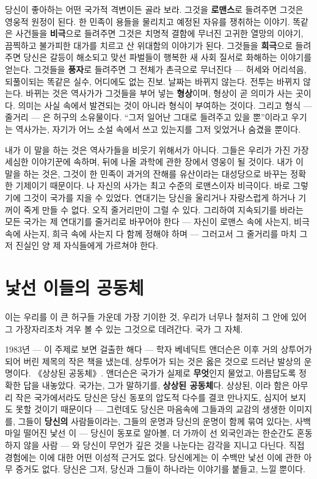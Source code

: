 당신이 좋아하는 어떤 국가적 격변이든 골라 보라. 그것을 \textbf{로맨스}로 들려주면 그것은 영웅적 원정이 된다. 한 민족이 용들을 물리치고 예정된 자유를 쟁취하는 이야기. 똑같은 사건들을 \textbf{비극}으로 들려주면 그것은 치명적 결함에 무너진 고귀한 열망의 이야기, 끔찍하고 불가피한 대가를 치르고 산 위대함의 이야기가 된다. 그것들을 \textbf{희극}으로 들려주면 당신은 갈등이 해소되고 맞선 파벌들이 행복한 새 사회 질서로 화해하는 이야기를 얻는다. 그것들을 \textbf{풍자}로 들려주면 그 전체가 촌극으로 무너진다 — 허세와 어리석음, 되풀이되는 똑같은 실수, 어디에도 없는 진보. 날짜는 바뀌지 않는다. 전투는 바뀌지 않는다. 바뀌는 것은 역사가가 그것들을 부어 넣는 \textbf{형상}이며, 형상이 곧 의미가 사는 곳이다. 의미는 사실 속에서 발견되는 것이 아니라 형식이 부여하는 것이다. 그리고 형식 — 줄거리 — 은 허구의 소유물이다. ``그저 일어난 그대로 들려주고 있을 뿐''이라고 우기는 역사가는, 자기가 어느 소설 속에서 쓰고 있는지를 그저 잊었거나 숨겼을 뿐이다.

내가 이 말을 하는 것은 역사가들을 비웃기 위해서가 아니다. 그들은 우리가 가진 가장 세심한 이야기꾼에 속하며, 뒤에 나올 과학에 관한 장에서 영웅이 될 것이다. 내가 이 말을 하는 것은, 그것이 한 민족이 과거의 잔해를 유산이라는 대성당으로 바꾸는 정확한 기제이기 때문이다. 나 자신의 사가는 최고 수준의 로맨스이자 비극이다. 바로 그렇기에 그것이 국가를 지을 수 있었다. 연대기는 당신을 울리거나 자랑스럽게 하거나 기꺼이 죽게 만들 수 없다. 오직 줄거리만이 그럴 수 있다. 그리하여 지속되기를 바라는 모든 국가는 제 연대기를 줄거리로 바꾸어야 한다 — 자신이 로맨스 속에 사는지, 비극 속에 사는지, 희극 속에 사는지 다 함께 정해야 하며 — 그러고서 그 줄거리를 마치 그저 진실인 양 제 자식들에게 가르쳐야 한다.

\section*{낯선 이들의 공동체}

이는 우리를 이 큰 허구들 가운데 가장 기이한 것, 우리가 너무나 철저히 그 안에 있어 그 가장자리조차 겨우 볼 수 있는 그것으로 데려간다. 국가 그 자체.

1983년 — 이 주제로 보면 걸출한 해다 — 학자 베네딕트 앤더슨은 이후 거의 상투어가 되어 버린 제목의 작은 책을 냈는데, 상투어가 되는 것은 옳은 것으로 드러난 발상의 운명이다. 《상상된 공동체》. 앤더슨은 국가가 실제로 \textbf{무엇}인지 물었고, 아름답도록 정확한 답을 내놓았다. 국가는, 그가 말하기를, \textbf{상상된 공동체}다. 상상된, 이라 함은 아무리 작은 국가에서라도 당신은 당신 동포의 압도적 다수를 결코 만나지도, 심지어 보지도 못할 것이기 때문이다 — 그런데도 당신은 마음속에 그들과의 교감의 생생한 이미지를, 그들이 \textbf{당신의} 사람들이라는, 그들의 운명과 당신의 운명이 함께 묶여 있다는, 사백 마일 떨어진 낯선 이 — 당신이 동포로 알아볼, 더 가까이 선 외국인과는 한순간도 혼동하지 않을 사람 — 와 당신이 무언가 깊은 것을 나눈다는 감각을 지니고 다닌다. 직접 경험에는 이에 대한 어떤 이성적 근거도 없다. 당신에게는 이 수백만 낯선 이에 관한 아무 증거도 없다. 당신은 그저, 당신과 그들이 하나라는 이야기를 붙들고, 느낄 뿐이다.

